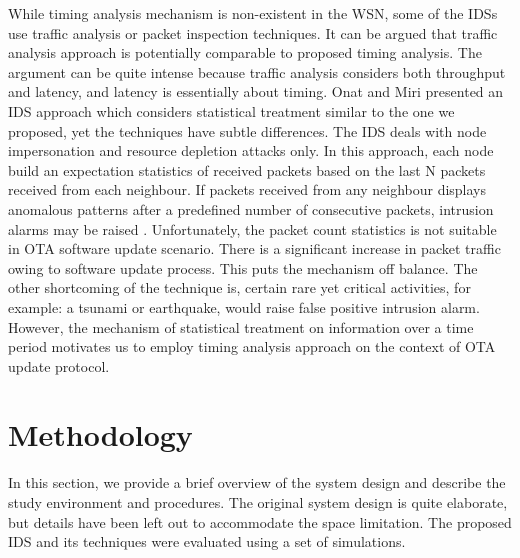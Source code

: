 \documentclass[conference,final]{IEEEtran}
\newcommand{\notedme}[1]{\raisebox{0pt}[0pt][0pt]{\pdfcomment[open=true,color=blue]{#1}}}
\begin{document}
While timing analysis mechanism is non-existent in the WSN, some of the IDSs use traffic analysis or packet inspection  techniques.
It can be argued that traffic analysis approach is potentially comparable to proposed timing analysis.
The argument can be quite intense because traffic analysis considers both throughput and latency, and latency is essentially about timing.
Onat and Miri presented an IDS approach which considers statistical treatment similar to the one we proposed, yet the techniques have subtle differences.
The IDS deals with node impersonation and resource depletion attacks only.
In this approach, each node build an expectation statistics of received packets based on the last N packets received from each neighbour.
If packets received from any neighbour displays anomalous patterns after a predefined number of consecutive packets, intrusion alarms may be raised \cite{1512911}.
Unfortunately, the  packet count statistics is not suitable in OTA software update scenario.
There is a significant increase in packet traffic owing to software update process. 
This puts the mechanism off balance.
The other shortcoming of the technique is, certain rare yet critical activities, for example: a tsunami or earthquake, would raise false positive intrusion alarm.
However, the mechanism of statistical treatment on information over a time period motivates us to employ timing analysis approach on the context of OTA update protocol.


\section{Methodology}
\label{sec:meth}
In this section, we provide a brief overview of the system design and describe the study environment and procedures.
The original system design is quite elaborate, but details have been left out to accommodate the space limitation.
The proposed IDS and its techniques were evaluated using a set of simulations. %
\end{document}
